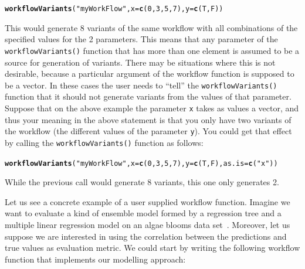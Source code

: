 \documentclass[10pt,a4paper]{article}\usepackage[]{graphicx}\usepackage[]{color}
\makeatletter
\newcommand{\hlnum}[1]{\textcolor[rgb]{0.686,0.059,0.569}{#1}}%
\newcommand{\hlstr}[1]{\textcolor[rgb]{0.192,0.494,0.8}{#1}}%
\newcommand{\hlstd}[1]{\textcolor[rgb]{0.345,0.345,0.345}{#1}}%
\newcommand{\hlkwc}[1]{\textcolor[rgb]{0.333,0.667,0.333}{#1}}%
\newcommand{\hlkwd}[1]{\textcolor[rgb]{0.737,0.353,0.396}{\textbf{#1}}}%
\newenvironment{kframe}{%
 \def\at@end@of@kframe{}%
 \ifinner\ifhmode%
  \def\at@end@of@kframe{\end{minipage}}%
  \begin{minipage}{\columnwidth}%
 \fi\fi%
 \def\FrameCommand##1{\hskip\@totalleftmargin \hskip-\fboxsep
 \colorbox{shadecolor}{##1}\hskip-\fboxsep
     \hskip-\linewidth \hskip-\@totalleftmargin \hskip\columnwidth}%
 \MakeFramed {\advance\hsize-\width
   \@totalleftmargin\z@ \linewidth\hsize
   \@setminipage}}%
 {\par\unskip\endMakeFramed%
 \at@end@of@kframe}
\newenvironment{knitrout}{}{} %
\makeatother
\begin{document}
\begin{knitrout}
\color{fgcolor}\begin{kframe}
\begin{alltt}
\hlkwd{workflowVariants}\hlstd{(}\hlstr{"myWorkFlow"}\hlstd{,} \hlkwc{x} \hlstd{=} \hlkwd{c}\hlstd{(}\hlnum{0}\hlstd{,} \hlnum{3}\hlstd{,} \hlnum{5}\hlstd{,} \hlnum{7}\hlstd{),} \hlkwc{y} \hlstd{=} \hlkwd{c}\hlstd{(T, F))}
\end{alltt}
\end{kframe}
\end{knitrout}


This would generate 8 variants of the same workflow with all
combinations of the specified values for the 2 parameters.  This means
that any parameter of the \texttt{workflowVariants()} function that has more
than one element is assumed to be a source for generation of
variants. There may be situations where this is not desirable, because
a particular argument of the workflow function is supposed to be a
vector. In these cases the user needs to ``tell'' the
\texttt{workflowVariants()} function that it should not generate variants from
the values of that parameter. Suppose that on the above example the
parameter \texttt{x} takes as values a vector, and thus your meaning
in the above statement is that you only have two variants of the
workflow (the different values of the parameter \texttt{y}). You could get
that effect by calling the \texttt{workflowVariants()} function as follows:

\begin{knitrout}
\color{fgcolor}\begin{kframe}
\begin{alltt}
\hlkwd{workflowVariants}\hlstd{(}\hlstr{"myWorkFlow"}\hlstd{,} \hlkwc{x} \hlstd{=} \hlkwd{c}\hlstd{(}\hlnum{0}\hlstd{,} \hlnum{3}\hlstd{,} \hlnum{5}\hlstd{,} \hlnum{7}\hlstd{),} \hlkwc{y} \hlstd{=} \hlkwd{c}\hlstd{(T, F),} \hlkwc{as.is} \hlstd{=} \hlkwd{c}\hlstd{(}\hlstr{"x"}\hlstd{))}
\end{alltt}
\end{kframe}
\end{knitrout}


While the previous call would generate 8 variants, this one only generates 2.

Let us see a concrete example of a user supplied workflow
function. Imagine we want to evaluate a kind of ensemble model formed
by a regression tree and a multiple linear regression model on an
algae blooms data set~\cite{Tor10}. Moreover, let us suppose we are
interested in using the correlation between the predictions and true
values as evaluation metric. We could start by writing the following
workflow function that implements our modelling approach:
\end{document}
